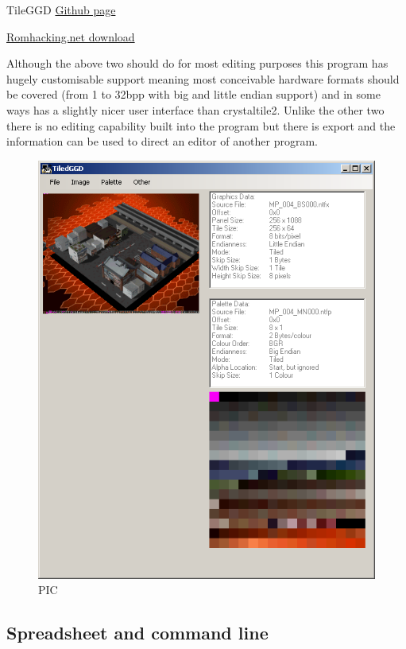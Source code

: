 \documentclass[
]{book}
\begin{document}
TileGGD \href{https://github.com/barubary/tiledggd}{Github page}

\href{http://www.romhacking.net/utilities/646/}{Romhacking.net download}

Although the above two should do for most editing purposes this program has hugely customisable support meaning most conceivable hardware formats should be covered (from 1 to 32bpp with big and little endian support) and in some ways has a slightly nicer user interface than crystaltile2. Unlike the other two there is no editing capability built into the program but there is export and the information can be used to direct an editor of another program.

\begin{figure}
\centering
\includegraphics{images/15_home_fast6191_romhackingguide_unrenamed_file___romhackingguidetileeeditorsshowcasetileggd1.png}
\caption{PIC}
\end{figure}

\hypertarget{spreadsheet-and-command-line}{%
\subsection{Spreadsheet and command line}\label{spreadsheet-and-command-line}}
\end{document}

